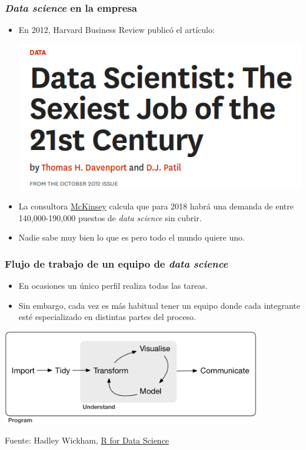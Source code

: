 \documentclass{beamer}
\begin{document}
\begin{frame}
\frametitle{\textit{Data science} en la empresa}
\begin{itemize}
\item En 2012, Harvard Business Review publicó el artículo:

\begin{center}
\includegraphics[scale=0.4]{data.png}
\end{center}

\item La consultora \href{http://www.mckinsey.com/business-functions/business-technology/our-insights/big-data-the-next-frontier-for-innovation}{McKinsey} calcula que para 2018 habrá una demanda de entre 140,000-190,000 puestos de \textit{data science} sin cubrir.

\item Nadie sabe muy bien lo que es pero todo el mundo quiere uno.
\end{itemize}
\end{frame}


\begin{frame}
\frametitle{Flujo de trabajo de un equipo de \textit{data science}}
\begin{itemize}
\item En ocasiones un único perfil realiza todas las tareas.
\item Sin embargo, cada vez es más habitual tener un equipo donde cada integrante esté especializado en distintas partes del proceso. 
\end{itemize}
\begin{center}
\includegraphics[width=0.85\textwidth]{data-science.png}

{\footnotesize Fuente: Hadley Wickham, \href{http://r4ds.had.co.nz/}{R for Data Science}}
\end{center}
\end{frame}
\end{document}
